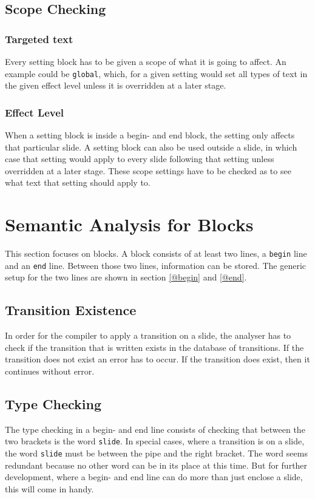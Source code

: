 \subsection{Scope Checking}

\subsubsection*{Targeted text}
Every setting block has to be given a scope of what it is going to affect. An example could be \texttt{global}, which, for a given setting would set all types of text in the given effect level unless it is overridden at a later stage.
\subsubsection*{Effect Level}
When a setting block is inside a begin- and end block, the setting only affects that particular slide.
A setting block can also be used outside a slide, in which case that setting would apply to every slide following that setting unless overridden at a later stage. These scope settings have to be checked as to see what text that setting should apply to.

\section{Semantic Analysis for Blocks}
This section focuses on blocks. A block consists of at least two lines, a \texttt{begin} line and an \texttt{end} line.
Between those two lines, information can be stored.
The generic setup for the two lines are shown in section \ref{@begin} and \ref{@end}.

    \subsection{Transition Existence}
In order for the compiler to apply a transition on a slide, the analyser has to check if the transition that is written exists in the database of transitions. If the transition does not exist an error has to occur. If the transition does exist, then it continues without error.

    \subsection{Type Checking}
The type checking in a begin- and end line consists of checking that between the two brackets is the word \texttt{slide}. In special cases, where a transition is on a slide, the word \texttt{slide} must be between the pipe and the right bracket. The word seems redundant because no other word can be in its place at this time. But for further development, where a begin- and end line can do more than just enclose a slide, this will come in handy.


